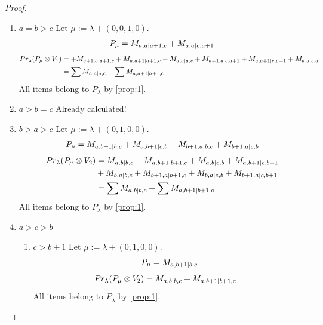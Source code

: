 \begin{proof}
\begin{enumerate}
\item $a=b>c$
        Let $\mu:=\lambda + (0,0,1,0) $. 
\begin{equation}\notag
  \begin{aligned}
      P_{\mu} =
M_{a,a|a+1,c}
+M_{a,a|c,a+1}
  \end{aligned}
\end{equation}
\begin{equation}\notag
  \begin{aligned}
  Pr_{\lambda}(P_\mu \otimes V_1) &=
+M_{a+1,a|a+1,c}
+M_{a,a+1|a+1,c}
+M_{a,a|a,c} 
+M_{a+1,a|c,a+1}
+M_{a,a+1|c,a+1}
+M_{a,a|c,a} \\
                                  &=
\sum M_{a,a|a,c}
+\sum M_{a,a+1|a+1,c}
  \end{aligned}
\end{equation}
All items belong to $P_\lambda$ by \cref{prop:1}.

\item $a>b=c$ Already calculated!

\item $b>a>c$
        Let $\mu:=\lambda + (0,1,0,0) $. 
\begin{equation}\notag
  \begin{aligned}
      P_{\mu} =
M_{a,b+1|b,c}
+M_{a,b+1|c,b}
+M_{b+1,a|b,c}
+M_{b+1,a|c,b}
  \end{aligned}
\end{equation}
\begin{equation}\notag
  \begin{aligned}
  Pr_{\lambda}(P_\mu \otimes V_2) &=
M_{a,b|b,c}
+M_{a,b+1|b+1,c}
+M_{a,b|c,b}
+M_{a,b+1|c,b+1} \\
                                  &+
M_{b,a|b,c}
+M_{b+1,a|b+1,c}
+M_{b,a|c,b}
+M_{b+1,a|c,b+1}\\
                                  &=
\sum M_{a,b|b,c}
+\sum M_{a,b+1|b+1,c}
  \end{aligned}
\end{equation}
All items belong to $P_\lambda$ by \cref{prop:1}.

\item $a>c>b$
\begin{enumerate}
  \item $c>b+1$
        Let $\mu:=\lambda + (0,1,0,0) $. 
\begin{equation}\notag
  \begin{aligned}
      P_{\mu} =
M_{a,b+1|b,c}
  \end{aligned}
\end{equation}
\begin{equation}\notag
  \begin{aligned}
  Pr_{\lambda}(P_\mu \otimes V_2) &=
M_{a,b|b,c}
+M_{a,b+1|b+1,c}
  \end{aligned}
\end{equation}
All items belong to $P_\lambda$ by \cref{prop:1}.


\end{enumerate}
\end{enumerate}
\end{proof}
